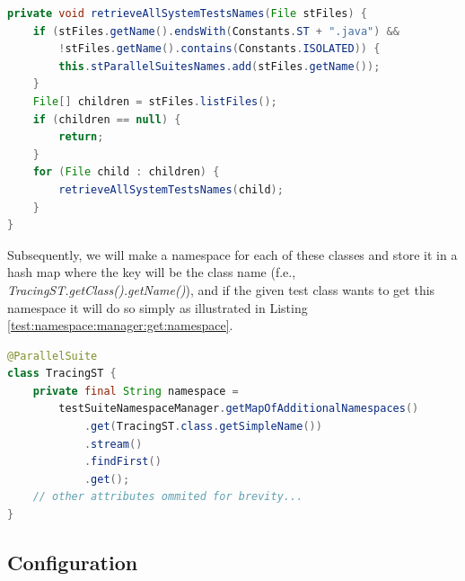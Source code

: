 \begin{lstlisting}[language=Java,label=test:namespace:manager:list:files,caption=Dynamically list all @ParallelSuites,frame=tb]
private void retrieveAllSystemTestsNames(File stFiles) {
    if (stFiles.getName().endsWith(Constants.ST + ".java") &&
        !stFiles.getName().contains(Constants.ISOLATED)) {
        this.stParallelSuitesNames.add(stFiles.getName());
    }
    File[] children = stFiles.listFiles();
    if (children == null) {
        return;
    }
    for (File child : children) {
        retrieveAllSystemTestsNames(child);
    }
}
\end{lstlisting}
Subsequently, we will make a namespace for each of these classes and store it in a hash map where the key will be the class name
(f.e., \emph{TracingST.getClass().getName()}), and if the given test class wants to get this namespace it will do so simply as
illustrated in Listing \ref{test:namespace:manager:get:namespace}.

\begin{lstlisting}[language=Java,label=test:namespace:manager:get:namespace,caption=@ParallelSuite query generated (dynamically) namespace,frame=tb]
@ParallelSuite
class TracingST {
    private final String namespace =
        testSuiteNamespaceManager.getMapOfAdditionalNamespaces()
            .get(TracingST.class.getSimpleName())
            .stream()
            .findFirst()
            .get();
    // other attributes ommited for brevity...
}
\end{lstlisting}

\subsection{Configuration}
\label{05:class:wide:config}

